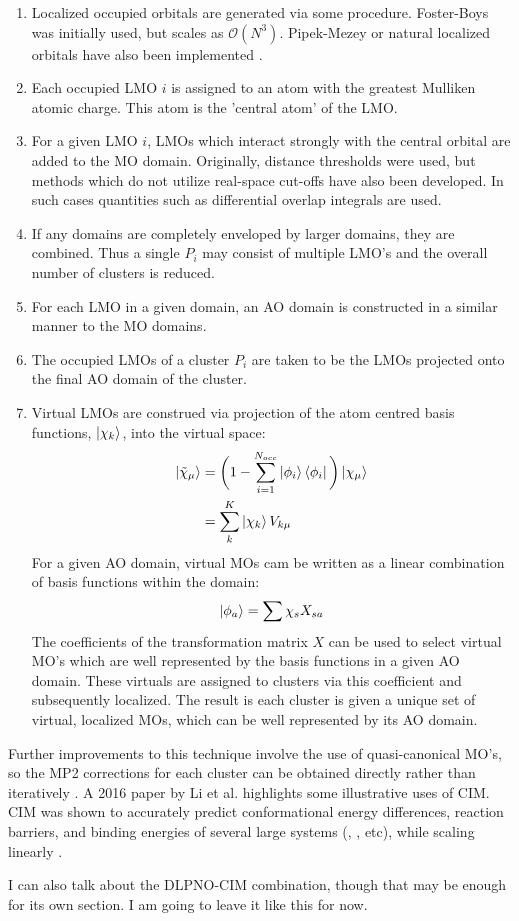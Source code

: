 \begin{enumerate}
\item Localized occupied orbitals are generated via some procedure. Foster-Boys was initially used, but scales as $\mathcal{O}(N^3)$. Pipek-Mezey or natural localized orbitals have also been implemented \cite{doi:10.1063/1.3641642}. 
\item Each occupied LMO $i$ is assigned to an atom with the greatest Mulliken atomic charge. This atom is the 'central atom' of the LMO. \item For a given LMO $i$, LMOs which interact strongly with the central orbital are added to the MO domain. Originally, distance thresholds were used, but methods which do not utilize real-space cut-offs have also been developed. In such cases quantities such as differential overlap integrals are used. 
\item If any domains are completely enveloped by larger domains, they are combined. Thus a single $P_i$ may consist of multiple LMO's and the overall number of clusters is reduced. 
\item For each LMO in a given domain, an AO domain is constructed in a similar manner to the MO domains. 
\item The occupied LMOs of a cluster $P_i$ are taken to be the LMOs projected onto the final AO domain of the cluster. 
\item Virtual LMOs are construed via projection of the atom centred basis functions, $\ket{\chi_k}$, into the virtual space:
\begin{align}
\ket{\tilde{\chi}_\mu} &= \bigg( 1-\sum_{i=1}^{N_{occ}} \ket{\phi_i} \bra{\phi_i}\bigg)\ket{{\chi}_\mu}\\
&=\sum_k^K{\ket{\chi_k} V_{k\mu}}
\end{align}
For a given AO domain, virtual MOs cam be written as a linear combination of basis functions within the domain:
\begin{equation}
\ket{\phi_a} = \sum {\chi_s}X_{sa}
\end{equation}
The coefficients of the transformation matrix $X$ can be used to select virtual MO's which are well represented by the basis functions in a given AO domain. These virtuals are assigned to clusters via this coefficient and subsequently localized. The result is each cluster is given a unique set of virtual, localized MOs, which can be well represented by its AO domain. 
\end{enumerate}


Further improvements to this technique involve the use of quasi-canonical MO's, so the MP2 corrections for each cluster can be obtained directly rather than iteratively \cite{C2CP23916G}. A 2016 paper by Li et al. highlights some illustrative uses of CIM. CIM was shown to accurately predict conformational energy differences, reaction barriers, and binding energies of several large systems (, , etc), while scaling linearly \cite{doi:10.1080/00268976.2016.1139755}. 




I can also talk about the DLPNO-CIM combination, though that may be enough for its own section. I am going to leave it like this for now.  
